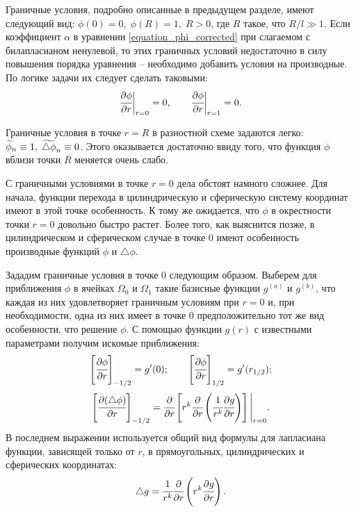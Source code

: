 \documentclass[a4paper,12pt]{article}
\newcommand*{\hm}[1]{#1\nobreak\discretionary{}
{\hbox{$\mathsurround=0pt #1$}}{}}
\theoremstyle{plain}
\theoremstyle{definition}
\begin{document}
Граничные условия, подробно описанные в предыдущем разделе, имеют следующий вид: $\phi(0) = 0, \; \phi(R) = 1, \; R > 0$, где $R$ такое, что $R / l \gg 1$. Если коэффициент $\alpha$ в уравнении \eqref{equation_phi_corrected} при слагаемом с билапласианом ненулевой, то этих граничных условий недостаточно в силу повышения порядка уравнения -- необходимо добавить условия на производные. По логике задачи их следует сделать таковыми:
$$\cfrac{\partial \phi}{\partial r} \bigg|_{r = 0} = 0, \qquad \cfrac{\partial \phi}{\partial r} \bigg|_{r = 1} = 0 \text{.}$$

Граничные условия в точке $r = R$ в разностной схеме задаются легко: $\widetilde{\phi}_n \hm \equiv 1, \; \widetilde{\triangle \phi}_n \equiv 0$. Этого оказывается достаточно ввиду того, что функция $\phi$ вблизи точки $R$ меняется очень слабо.

С граничными условиями в точке $r = 0$ дела обстоят намного сложнее. Для начала, функции перехода в цилиндрическую и сферическую систему координат имеют в этой точке особенность. К тому же ожидается, что $\phi$ в окрестности точки $r = 0$ довольно быстро растет. Более того, как выяснится позже, в цилиндрическом и сферическом случае в точке $0$ имеют особенность производные функций $\phi$ и $\triangle \phi$.

Зададим граничные условия в точке $0$ следующим образом. Выберем для приближения $\phi$ в ячейках $\Omega_0$ и $\Omega_1$ такие базисные функции $g^{(a)}$ и $g^{(b)}$, что каждая из них удовлетворяет граничным условиям при $r = 0$ и, при необходимости, одна из них имеет в точке $0$ предположительно тот же вид особенности, что решение $\phi$. С помощью функции $g(r)$ с известными параметрами получим искомые приближения:
$$\left[ \cfrac{\partial \phi}{\partial r} \right]_{-1/2} = g'(0); \qquad \left[ \cfrac{\partial \phi}{\partial r} \right]_{1/2} = g'(r_{1/2}) \text{;}$$
$$\left[ \cfrac{\partial (\triangle \phi)}{\partial r} \right]_{-1/2} = \cfrac{\partial}{\partial r} \left[ r^k \cfrac{\partial}{\partial r} \left(\cfrac{1}{r^k} \cfrac{\partial g}{\partial r} \right) \right] \Bigg|_{r = 0} \text{.}$$
В последнем выражении используется общий вид формулы для лапласиана функции, зависящей только от $r$, в прямоугольных, цилиндрических и сферических координатах:
\begin{equation}
    \triangle g = \cfrac{1}{r^k} \cfrac{\partial}{\partial r} \left( r^k \cfrac{\partial g}{\partial r} \right) \text{.}
    \label{equation_laplasian_common}
\end{equation}
\end{document}

